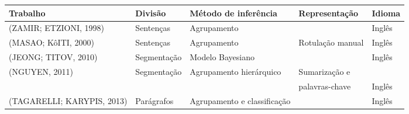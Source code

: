 
\begin{table}[!h]
	\centering

	\begin{tabular}{lllll} \hline
		\textbf{Trabalho} & \textbf{Divisão} & \textbf{Método de inferência}  & \textbf{Representação} & \textbf{Idioma}\\
		\hline\hline

	
	 (ZAMIR; ETZIONI, 1998) &      	Sentenças  & Agrupamento                 & & Inglês \\ \hline
	 (MASAO; KôITI, 2000) &        	Sentenças  & Agrupamento                 & Rotulação manual & Inglês \\ \hline
	 (JEONG; TITOV, 2010) &        	Segmentação   & Modelo Bayesiano            & & Inglês \\ \hline
	 (NGUYEN, 2011) &              	Segmentação  & Agrupamento hierárquico     & Sumarização e \\ &&&palavras-chave& Inglês  \\ \hline
	 (TAGARELLI; KARYPIS, 2013) &  	Parágrafos & Agrupamento e classificação & & Inglês \\ \hline

	\end{tabular}

\end{table}







